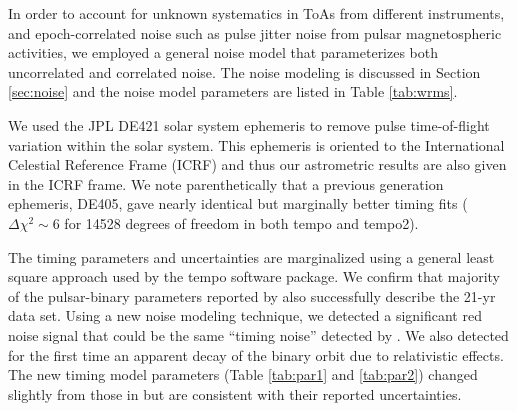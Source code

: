In order to account for unknown systematics in ToAs from different
instruments, and epoch-correlated noise such as pulse jitter noise from pulsar
magnetospheric activities, we employed a general noise model that parameterizes both uncorrelated and
correlated noise. The noise modeling is discussed in Section \ref{sec:noise} and the
noise model parameters are listed in Table \ref{tab:wrms}. 

We used the JPL DE421 solar system ephemeris \citep{fwb09} to remove pulse
time-of-flight variation within the solar system. This ephemeris is oriented
to the International Celestial Reference Frame (ICRF) and thus our astrometric
results are also given in the ICRF frame. We note parenthetically that a
previous generation ephemeris, DE405, gave nearly identical but marginally
better timing fits ($\Delta\chi^2\sim6$ for 14528 degrees of freedom in both
{\sc tempo} and {\sc tempo2}).

The timing parameters and uncertainties are marginalized using a general least
square approach used by the {\sc tempo} software package. 
We confirm that majority of the pulsar-binary parameters reported by
\citet{sns+05} also successfully describe the 21-yr data set. Using a new
noise modeling technique, we detected 
a significant red noise signal that could be the same ``timing noise'' detected by
\citet{sns+05}.
We also detected for the first time an apparent decay of the binary orbit due to
relativistic effects.
The new timing model parameters (Table \ref{tab:par1} and \ref{tab:par2}) changed slightly from
those in \citet{sns+05} but are consistent with their reported uncertainties.



